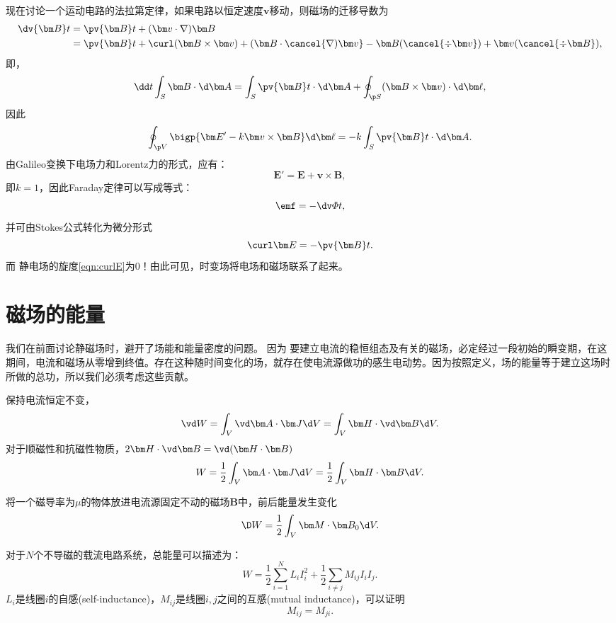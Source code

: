 现在讨论一个运动电路的法拉第定律，如果电路以恒定速度$\bm v$移动，则磁场的迁移导数为
\begin{align*}
    \dv{\bm B}t&=\pv{\bm B}t+(\bm v\cdot\nabla)\bm B\\
    &=\pv{\bm B}t+\curl(\bm B\times\bm v)+(\bm B\cdot\cancel{\nabla)\bm v}-\bm B(\cancel{\div\bm v})+\bm v(\cancel{\div\bm B}),
\end{align*}
即，
\begin{align*}
    \dd t\int_S\bm B\cdot\d\bm A=\int_S\pv{\bm B}t\cdot\d\bm A+\oint_{\p S}(\bm B\times\bm v)\cdot\d\bm\ell,
\end{align*}
因此 
\[
    \oint_{\p V}\bigp{\bm E'-k\bm v\times\bm B}\d\bm\ell=-k\int_S\pv{\bm B}t\cdot\d\bm A.
\]
由Galileo变换下电场力和Lorentz力的形式，应有：
\[
    \bm E'=\bm E+\bm v\times\bm B,
\]
即$k=1$，因此Faraday定律可以写成等式：
\begin{equation}
    \label{eqn:Faraday}
    \emf=-\dv\varPhi t,
\end{equation}
并可由Stokes公式转化为微分形式
\begin{equation}
    \label{eqn:curlE-B}
    \curl\bm E=-\pv{\bm B}t.
\end{equation}
而%
静电场的旋度\eqref{eqn:curlE}为0！由此可见，时变场将电场和磁场联系了起来。

\section{磁场的能量}
\label{sec:energy in the magnetic field}

我们在前面讨论静磁场时，避开了场能和能量密度的问题。
因为
要建立电流的稳恒组态及有关的磁场，必定经过一段初始的瞬变期，在这期间，电流和磁场从零增到终值。存在这种随时间变化的场，就存在使电流源做功的感生电动势。因为按照定义，场的能量等于建立这场时所做的总功，所以我们必须考虑这些贡献。

保持电流恒定不变，
\[
    \vd W=\int_V\vd\bm A\cdot\bm J\d V=\int_V\bm H\cdot\vd\bm B\d V.
\]
对于顺磁性和抗磁性物质，$2\bm H\cdot\vd\bm B=\vd(\bm H\cdot\bm B)$
\[
    W=\frac12\int_V\bm A\cdot\bm J\d V=\frac12\int_V\bm H\cdot\bm B\d V.
\]

将一个磁导率为$\mu$的物体放进电流源固定不动的磁场$\bm B$中，前后能量发生变化
\[
    \D W=\frac12\int_V\bm M\cdot\bm B_0\d V.
\]

\label{ssec:self- and mutual inductance}

对于$N$个不导磁的载流电路系统，总能量可以描述为：
\[
    W=\frac12\sum_{i=1}^NL_iI_i^2+\frac12\sum_{i\neq j}M_{ij}I_iI_j.
\]
$L_i$是线圈$i$的自感(self-inductance)，$M_{ij}$是线圈$i,j$之间的互感(mutual inductance)，可以证明 
\[
    M_{ij}=M_{ji}.
\]

